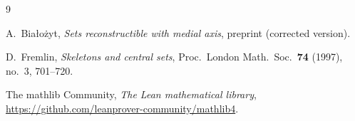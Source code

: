\documentclass[11pt]{article}
\theoremstyle{remark}
\begin{document}
\begin{thebibliography}{9}

 A.~Bia\l{}o\.zyt, \emph{Sets reconstructible with medial axis}, preprint
(corrected version).

 D.~Fremlin, \emph{Skeletons and central sets}, Proc.\ London Math.\ Soc.\
\textbf{74} (1997), no.~3, 701--720.

 The mathlib Community, \emph{The Lean mathematical library},
\url{https://github.com/leanprover-community/mathlib4}.

\end{thebibliography}
\end{document}
